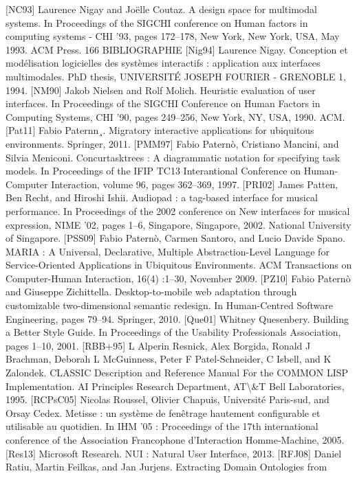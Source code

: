 \documentclass{article}
\begin{document}
[NC93]
Laurence Nigay and Jo\"{e}lle Coutaz. A design space for multimodal systems. In Proceedings of the SIGCHI conference on Human factors in computing systems - CHI ’93,
pages 172–178, New York, New York, USA, May 1993. ACM Press.
166
BIBLIOGRAPHIE
[Nig94]
Laurence Nigay. Conception et mod\'{e}lisation logicielles des syst\`{e}mes interactifs : application aux interfaces multimodales. PhD thesis, UNIVERSITÉ JOSEPH FOURIER
- GRENOBLE 1, 1994.
[NM90]
Jakob Nielsen and Rolf Molich. Heuristic evaluation of user interfaces. In Proceedings
of the SIGCHI Conference on Human Factors in Computing Systems, CHI ’90, pages
249–256, New York, NY, USA, 1990. ACM.
[Pat11]
Fabio Paternn¸. Migratory interactive applications for ubiquitous environments. Springer, 2011.
[PMM97]
Fabio Paternò, Cristiano Mancini, and Silvia Meniconi. Concurtasktrees : A diagrammatic notation for specifying task models. In Proceedings of the IFIP TC13 Interantional Conference on Human-Computer Interaction, volume 96, pages 362–369, 1997.
[PRI02]
James Patten, Ben Recht, and Hiroshi Ishii. Audiopad : a tag-based interface for musical performance. In Proceedings of the 2002 conference on New interfaces for musical
expression, NIME ’02, pages 1–6, Singapore, Singapore, 2002. National University of
Singapore.
[PSS09]
Fabio Paternò, Carmen Santoro, and Lucio Davide Spano.
MARIA : A Universal,
Declarative, Multiple Abstraction-Level Language for Service-Oriented Applications
in Ubiquitous Environments.
ACM Transactions on Computer-Human Interaction,
16(4) :1–30, November 2009.
[PZ10]
Fabio Paternò and Giuseppe Zichittella. Desktop-to-mobile web adaptation through
customizable two-dimensional semantic redesign. In Human-Centred Software Engineering, pages 79–94. Springer, 2010.
[Que01]
Whitney Quesenbery. Building a Better Style Guide. In Proceedings of the Usability
Professionals Association, pages 1–10, 2001.
[RBB+95]
L Alperin Resnick, Alex Borgida, Ronald J Brachman, Deborah L McGuinness, Peter F Patel-Schneider, C Isbell, and K Zalondek. CLASSIC Description and Reference
Manual For the COMMON LISP Implementation. AI Principles Research Department,
AT\textbackslash{}&T Bell Laboratories, 1995.
[RCPsC05]
Nicolas Roussel, Olivier Chapuis, Universit\'{e} Paris-sud, and Orsay Cedex. Metisse :
un syst\`{e}me de fen\^{e}trage hautement conﬁgurable et utilisable au quotidien. In IHM
’05 : Proceedings of the 17th international conference of the Association Francophone
d’Interaction Homme-Machine, 2005.
[Res13]
Microsoft Research. NUI : Natural User Interface, 2013.
[RFJ08]
Daniel Ratiu, Martin Feilkas, and Jan Jurjens. Extracting Domain Ontologies from
\end{document}
